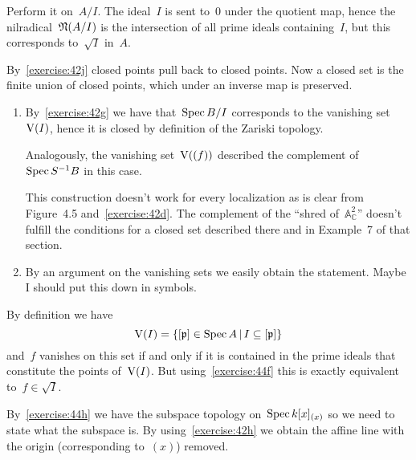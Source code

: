 \begin{exercise}
  \label{exercise:44f}
  Perform it on~$A/I$. The ideal~$I$ is sent to~$0$ under the quotient map, hence the nilradical~$\mathfrak{N}(A/I)$ is the intersection of all prime ideals containing~$I$, but this corresponds to~$\sqrt{I}$ in~$A$.
\end{exercise}

\begin{exercise}
  By~\autoref{exercise:42j} closed points pull back to closed points. Now a closed set is the finite union of closed points, which under an inverse map is preserved.
\end{exercise}

\begin{exercise} %
  \label{exercise:44h}
  \begin{enumerate}
    \item By~\autoref{exercise:42g} we have that~$\operatorname{Spec} B/I$ corresponds to the vanishing set~$\operatorname{V}(I)$, hence it is closed by definition of the Zariski topology.

      Analogously, the vanishing set~$\operatorname{V}((f))$ described the complement of~$\operatorname{Spec} S^{-1}B$ in this case.

      This construction doesn't work for every localization as is clear from Figure~4.5 and~\autoref{exercise:42d}. The complement of the ``shred of~$\mathbb{A}_{\mathbb{C}}^2$'' doesn't fulfill the conditions for a closed set described there and in Example~7 of that section.

    \item By an argument on the vanishing sets we easily obtain the statement. Maybe I should put this down in symbols.
  \end{enumerate}
\end{exercise}

\begin{exercise}
  \label{exercise:44i}
  By definition we have
  \begin{equation}
    \operatorname{V}(I)=\left\{ [\mathfrak{p}]\in\operatorname{Spec} A\,|\,I\subseteq[\mathfrak{p}] \right\}
  \end{equation}
  and~$f$ vanishes on this set if and only if it is contained in the prime ideals that constitute the points of~$\operatorname{V}(I)$. But using~\autoref{exercise:44f} this is exactly equivalent to~$f\in\sqrt{I}$.
\end{exercise}

\begin{exercise}
  By~\autoref{exercise:44h} we have the subspace topology on~$\operatorname{Spec} k[x]_{(x)}$ so we need to state what the subspace is. By using~\autoref{exercise:42h} we obtain the affine line with the origin (corresponding to~$(x)$) removed.
\end{exercise}


